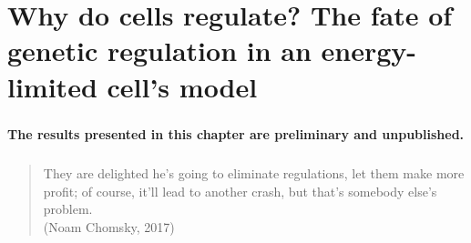 

\chapter{Why do cells regulate? The fate of genetic regulation in an energy-limited cell's model}
\label{ch:part2:second_result}

\paragraph{}
\paragraph{}
\paragraph{}
\paragraph{}
\paragraph{}
\paragraph{}
\paragraph{}
\paragraph{}
\begin{center}
\large \textbf{The results presented in this chapter are preliminary and unpublished.}
\end{center}

\newpage

\paragraph{}
\begin{quote}
They are delighted he's going to eliminate regulations, let them make more profit; of course, it'll lead to another crash, but that's somebody else's problem.\\(Noam Chomsky, 2017)
\end{quote}

